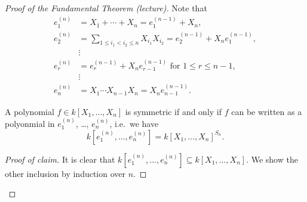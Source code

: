 \begin{proof}[Proof of the Fundamental Theorem (lecture)]
  Note that
  \begin{align*}
        e^{(n)}_1
    &=  X_1 + \dotsb + X_n = e_1^{(n-1)} + X_n, \\
        e^{(n)}_2
    &=  \sum_{1 \leq i_1 < i_2 \leq n} X_{i_1} X_{i_2} = e_2^{(n-1)} + X_n e_1^{(n-1)}, \\
    &   \vdots \tag{$\ast$}\\ 
        e^{(n)}_r
    &=  e^{(n-1)}_r + X_n e^{(n-1)}_{r-1} \text{ for } 1 \leq r \leq n-1, \\
    &   \vdots \\
        e^{(n)}_n
    &=  X_1 \dotsm X_{n-1} X_n = X_n e^{(n-1)}_{n-1}.
  \end{align*}
  \begin{claim}
    A polynomial $f \in k[X_1, \dotsc, X_n]$ is symmetric if and only if $f$ can be written as a polyonmial in $e^{(n)}_1$, \dots, $e^{(n)}_n$, i.e.\ we have
    \[
        k\left[ e^{(n)}_1, \dotsc, e^{(n)}_n \right]
      = k[X_1, \dotsc, X_n]^{S_n}.
    \]
  \end{claim}
  \begin{proof}[Proof of claim]
    It is clear that $k\left[ e^{(n)}_1, \dotsc, e^{(n)}_n \right] \subseteq k[X_1, \dotsc, X_n]$.
    We show the other inclusion by induction over $n$.
    

\end{proof}
\end{proof}
